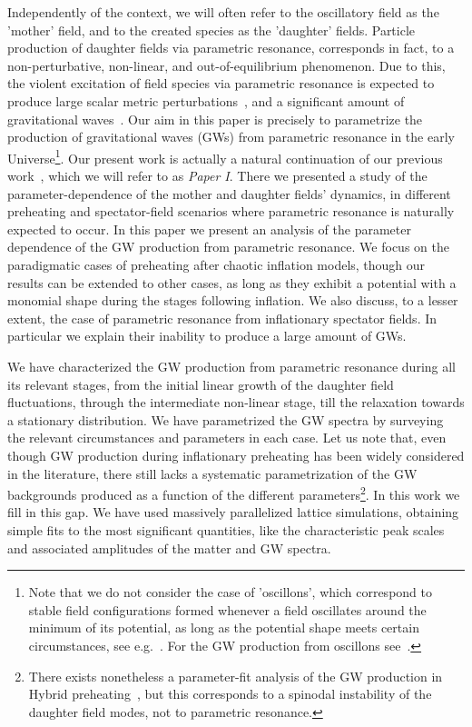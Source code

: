 \documentclass[a4paper,11pt]{article}
\begin{document}
Independently of the context, we will often refer to the oscillatory field as the 'mother' field, and to the created species as the 'daughter' fields. Particle production of daughter fields via parametric resonance, corresponds in fact, to a non-perturbative, non-linear, and out-of-equilibrium phenomenon. Due to this, the violent excitation of field species via parametric resonance is expected to produce large scalar metric perturbations~\cite{Bassett:1998wg,Bassett:1999mt,Bassett:1999ta,Finelli:2000ya,Chambers:2007se,Bond:2009xx}, and a significant amount of gravitational waves~\cite{Khlebnikov:1997di,Easther:2006gt,Easther:2006vd,GarciaBellido:2007dg,GarciaBellido:2007af,Dufaux:2007pt,Dufaux:2008dn,Figueroa:2011ye,Bethke:2013aba,Bethke:2013vca,Figueroa:2016ojl}. Our aim in this paper is precisely to parametrize the production of gravitational waves (GWs) from parametric resonance in the early Universe\footnote{Note that we do not consider the case of 'oscillons', which correspond to stable field configurations formed whenever a field oscillates around the minimum of its potential, as long as the potential shape meets certain circumstances, see e.g.~\cite{Copeland:1995fq,Amin:2011hj}. For the GW production from oscillons see~\cite{Zhou:2013tsa,Antusch:2016con}.}. Our present work is actually a natural continuation of our previous work~\cite{Figueroa:2016wxr}, which we will refer to as {\it Paper I}. There we presented a study of the parameter-dependence of the mother and daughter fields' dynamics, in different preheating and spectator-field scenarios where parametric resonance is naturally expected to occur. In this paper we present an analysis of the parameter dependence of the GW production from parametric resonance. We focus on the paradigmatic cases of preheating after chaotic inflation models, though our results can be extended to other cases, as long as they exhibit a potential with a monomial shape during the stages following inflation. We also discuss, to a lesser extent, the case of parametric resonance from inflationary spectator fields. In particular we explain their inability to produce a large amount of GWs.  

We have characterized the GW production from parametric resonance during all its relevant stages, from the initial linear growth of the daughter field fluctuations, through the intermediate non-linear stage, till the relaxation towards a stationary distribution. We have parametrized the GW spectra by surveying the relevant circumstances and parameters in each case. Let us note that, even though GW production during inflationary preheating has been widely considered in the literature, there still lacks a systematic parametrization of the GW backgrounds produced as a function of the different parameters\footnote{There exists nonetheless a parameter-fit analysis of the GW production in Hybrid preheating~\cite{Dufaux:2008dn}, but this corresponds to a spinodal instability of the daughter field modes, not to parametric resonance.}. In this work we fill in this gap. We have used massively parallelized lattice simulations, obtaining simple fits to the most significant quantities, like the characteristic peak scales and associated amplitudes of the matter and GW spectra.
\end{document}
